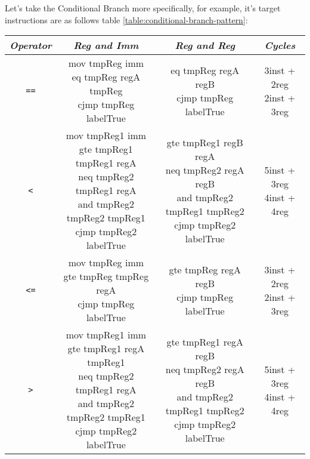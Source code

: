 Let's take the Conditional Branch more specifically, for example, it's target instructions are as follows table \ref{table:conditional-branch-pattern}:
\begin{table}[!ht]
    \centering
    \begin{tabular}{|c|c|c|c|}
        \hline
        \textit{Operator}  & \textit{Reg and Imm} & \textit{Reg and Reg} & \textit{Cycles}  \\ \hline
        \verb|==| & \makecell{mov tmpReg imm \\ eq tmpReg regA tmpReg \\ cjmp tmpReg labelTrue} & \makecell{eq tmpReg regA regB \\ cjmp tmpReg labelTrue} & \makecell{3inst + 2reg \\ 2inst + 3reg} \\ \hline
        \verb|<| & \makecell{mov tmpReg1 imm \\ gte tmpReg1 tmpReg1 regA \\ neq tmpReg2 tmpReg1 regA \\and tmpReg2 tmpReg2 tmpReg1 \\ cjmp tmpReg2 labelTrue} & \makecell{gte tmpReg1 regB regA \\ neq tmpReg2 regA regB \\ and tmpReg2 tmpReg1 tmpReg2 \\ cjmp tmpReg2 labelTrue} & \makecell{5inst + 3reg \\ 4inst + 4reg} \\ \hline
        \verb|<=| & \makecell{mov tmpReg imm \\ gte tmpReg tmpReg regA \\ cjmp tmpReg labelTrue} & \makecell{gte tmpReg regA regB \\ cjmp tmpReg labelTrue} & \makecell{3inst + 2reg \\ 2inst + 3reg} \\ \hline
        \verb|>| & \makecell{mov tmpReg1 imm \\ gte tmpReg1 regA tmpReg1 \\ neq tmpReg2 tmpReg1 regA \\and tmpReg2 tmpReg2 tmpReg1 \\ cjmp tmpReg2 labelTrue} & \makecell{gte tmpReg1 regA regB \\ neq tmpReg2 regA regB \\ and tmpReg2 tmpReg1 tmpReg2 \\ cjmp tmpReg2 labelTrue} & \makecell{5inst + 3reg \\ 4inst + 4reg} \\ \hline

\end{tabular}
\end{table}
